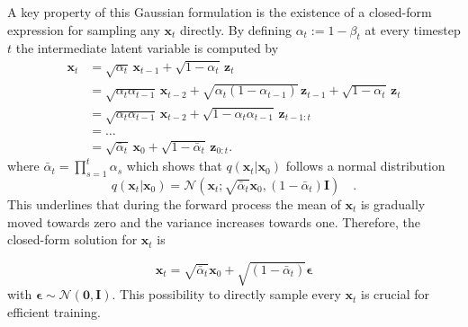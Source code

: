 A key property of this Gaussian formulation is the existence of a closed-form expression for sampling any $\mathbf{x}_{t}$ directly.  By defining $\alpha_t := 1-\beta_t$ at every timestep $t$ the intermediate latent variable is computed by
\begin{align}
\mathbf{x}_t &= \sqrt{\alpha_t} \, \mathbf{x}_{t-1} + \sqrt{1 - \alpha_t} \, \mathbf{z}_t \\
             &= \sqrt{\alpha_t \alpha_{t-1}} \, \mathbf{x}_{t-2} + \sqrt{\alpha_t (1 - \alpha_{t-1})} \, \mathbf{z}_{t-1} + \sqrt{1 - \alpha_t} \, \mathbf{z}_t \\
             &= \sqrt{\alpha_t \alpha_{t-1}} \, \mathbf{x}_{t-2} + \sqrt{1 - \alpha_t \alpha_{t-1}} \, \mathbf{z}_{t-1:t} \\
             &= \dots \\
             &= \sqrt{\bar{\alpha}_t} \, \mathbf{x}_0 + \sqrt{1 - \bar{\alpha}_t} \, \mathbf{z}_{0:t} .
\end{align}
where $\bar{\alpha}_t = \prod_{s=1}^t \alpha_s$ which shows that $q(\mathbf{x}_t|\mathbf{x}_0)$ follows a normal distribution
\begin{equation}
     q(\mathbf{x}_t | \mathbf{x}_{0}) = \mathcal{N} \left( \mathbf{x}_t;\sqrt{\bar{\alpha}_t} \mathbf{x}_0, (1- \bar{\alpha}_t)\mathbf{I}  \right) \quad.
\end{equation}
This underlines that during the forward process the mean of $\mathbf{x}_t$ is gradually moved towards zero and the variance increases towards one. Therefore, the closed-form solution for $\mathbf{x}_t$ is 

\begin{equation}
    \mathbf{x}_t =  \sqrt{\bar{\alpha}_t} \mathbf{x}_0 + \sqrt{(1- \bar{\alpha}_t)} \boldsymbol{\epsilon}
    \label{x_t}
\end{equation}
with $\boldsymbol{\epsilon} \sim \mathcal{N}(\mathbf{0}, \mathbf{I})$. This possibility to directly sample every $\mathbf{x}_t$ is crucial for efficient training.


